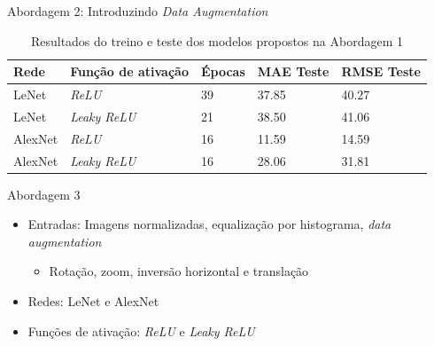 \begin{frame}{\large{Abordagem 2: Introduzindo \emph{Data Augmentation}}}
  \begin{table}[!ht]
		\caption{Resultados do treino e teste dos modelos propostos na Abordagem 1}
		\label{tab:results-1}
		\begin{center}
			\begin{tabular}{l l l l l}
				\toprule
				Rede & Função de ativação & Épocas & MAE Teste & RMSE Teste \\
				\midrule
        LeNet & \emph{ReLU}  & 39 & 37.85 & 40.27 \\
				LeNet & \emph{Leaky ReLU} & 21 & 38.50 & 41.06 \\
				AlexNet & \emph{ReLU}  & 16 & 11.59 & 14.59 \\
				AlexNet & \emph{Leaky ReLU} & 16 & 28.06 & 31.81 \\
				\bottomrule
			\end{tabular}
		\end{center}
	\end{table}
\end{frame}



\begin{frame}{\large{Abordagem 3}}
 \begin{itemize}
   \item Entradas: Imagens normalizadas, \alert{equalização por histograma}, \emph{data augmentation}
   \begin{itemize}
     \item Rotação, zoom, inversão horizontal e translação
   \end{itemize}
   \item Redes: LeNet e AlexNet
   \item Funções de ativação: \emph{ReLU} e \emph{Leaky ReLU}
   \end{itemize}
\end{frame}

